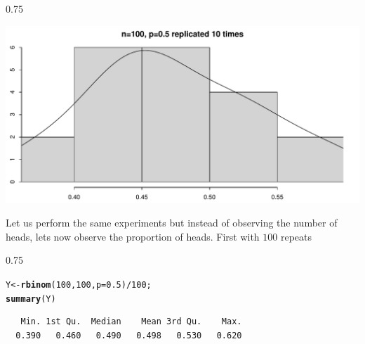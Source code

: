 \documentclass{beamer}\usepackage[]{graphicx}\usepackage[]{color}
\makeatletter
\newcommand{\hlnum}[1]{\textcolor[rgb]{0.2,0.2,0.2}{#1}}%
\newcommand{\hlopt}[1]{\textcolor[rgb]{0.102,0.102,0.102}{#1}}%
\newcommand{\hlstd}[1]{\textcolor[rgb]{0.102,0.102,0.102}{#1}}%
\newcommand{\hlkwb}[1]{\textcolor[rgb]{0.102,0.102,0.102}{#1}}%
\newcommand{\hlkwc}[1]{\textcolor[rgb]{0.2,0.2,0.2}{#1}}%
\newcommand{\hlkwd}[1]{\textcolor[rgb]{0.102,0.102,0.102}{\textbf{#1}}}%
\newenvironment{kframe}{%
 \def\at@end@of@kframe{}%
 \ifinner\ifhmode%
  \def\at@end@of@kframe{\end{minipage}}%
  \begin{minipage}{\columnwidth}%
 \fi\fi%
 \def\FrameCommand##1{\hskip\@totalleftmargin \hskip-\fboxsep
 \colorbox{shadecolor}{##1}\hskip-\fboxsep
     \hskip-\linewidth \hskip-\@totalleftmargin \hskip\columnwidth}%
 \MakeFramed {\advance\hsize-\width
   \@totalleftmargin\z@ \linewidth\hsize
   \@setminipage}}%
 {\par\unskip\endMakeFramed%
 \at@end@of@kframe}
\newenvironment{knitrout}{}{} %
\renewenvironment{knitrout}{\begin{spacing}{0.75}\begin{tiny}}{\end{tiny}\end{spacing}}
\makeatother
\begin{document}
\begin{frame}[fragile]

\begin{knitrout}\small
{}\color{fgcolor}

{\centering \includegraphics[width=0.89\linewidth]{figure/graphics-unnamed-chunk-9-1} 

}



\end{knitrout}

\end{frame}


\begin{frame}[fragile]

Let us perform the same experiments but instead of observing the number of heads, lets now observe the proportion of heads. First with $100$ repeats

\begin{knitrout}\small
{}\color{fgcolor}\begin{kframe}
\begin{alltt}
\hlstd{Y} \hlkwb{<-} \hlkwd{rbinom}\hlstd{(}\hlnum{100}\hlstd{,} \hlnum{100}\hlstd{,} \hlkwc{p}\hlstd{=}\hlnum{0.5}\hlstd{)}\hlopt{/} \hlnum{100}\hlstd{;}
\hlkwd{summary}\hlstd{(Y)}
\end{alltt}
\begin{verbatim}
   Min. 1st Qu.  Median    Mean 3rd Qu.    Max. 
  0.390   0.460   0.490   0.498   0.530   0.620 
\end{verbatim}
\end{kframe}
\end{knitrout}

\end{frame}
\end{document}
